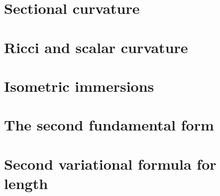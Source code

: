 \documentclass[letter-paper]{tufte-book}
\begin{document}

\section{Sectional curvature}


\section{Ricci and scalar curvature}


\section{Isometric immersions}


\section{The second fundamental form}


\section{Second variational formula for length}










\mainmatter




%


\end{document}
